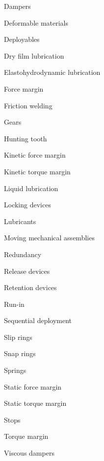 \documentclass[12pt]{article}
\begin{document}
Dampers

Deformable materials

Deployables

Dry film lubrication

Elastohydrodynamic lubrication

Force margin

Friction welding

Gears

Hunting tooth

Kinetic force margin

Kinetic torque margin

Liquid lubrication

Locking devices

Lubricants

Moving mechanical assemblies

Redundancy

Release devices

Retention devices

Run-in

Sequential deployment

Slip rings

Snap rings

Springs

Static force margin

Static torque margin

Stops

Torque margin

Viscous dampers

\end{document}
